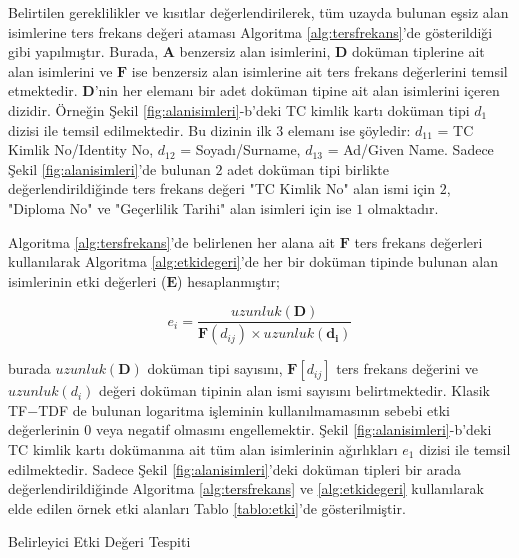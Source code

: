 \documentclass[conference, a4paper]{IEEEtran}
\begin{document}
Belirtilen gereklilikler ve kısıtlar değerlendirilerek, tüm uzayda bulunan eşsiz alan isimlerine ters frekans değeri
ataması Algoritma \ref{alg:tersfrekans}'de gösterildiği gibi yapılmıştır. Burada, $\mathbf{A}$ benzersiz alan
isimlerini, $\mathbf{D}$ doküman tiplerine ait alan isimlerini ve  $\mathbf{F}$ ise benzersiz alan isimlerine ait ters
frekans değerlerini temsil etmektedir. $\mathbf{D}$'nin her elemanı bir adet doküman tipine ait alan isimlerini içeren
dizidir. Örneğin Şekil \ref{fig:alanisimleri}-b'deki TC kimlik kartı doküman tipi $d_1$ dizisi ile temsil edilmektedir.
Bu dizinin ilk $3$ elemanı ise şöyledir: $d_{11}$ = TC Kimlik No/Identity No, $d_{12}$ = Soyadı/Surname, $d_{13}$ =
Ad/Given Name. Sadece Şekil \ref{fig:alanisimleri}'de bulunan $2$ adet doküman tipi birlikte değerlendirildiğinde ters
frekans değeri "TC Kimlik No" alan ismi için $2$, "Diploma No" ve "Geçerlilik Tarihi" alan isimleri için ise $1$
olmaktadır.

Algoritma \ref{alg:tersfrekans}'de belirlenen her alana ait $\mathbf{F}$ ters frekans değerleri kullanılarak Algoritma
\ref{alg:etkidegeri}'de her bir doküman tipinde bulunan alan isimlerinin etki değerleri ($\mathbf{E}$) hesaplanmıştır;

\begin{equation}
    e_i = \frac{uzunluk(\mathbf{D})}{\mathbf{F}(d_{ij}) \times uzunluk(\mathbf{d_i})}
\end{equation}{}

\noindent burada $uzunluk(\mathbf{D})$ doküman tipi sayısını, $\mathbf{F}[d_{ij}]$ ters frekans değerini ve
$uzunluk(d_i)$ değeri doküman tipinin alan ismi sayısını belirtmektedir. Klasik TF$-$TDF de bulunan logaritma
işleminin kullanılmamasının sebebi etki değerlerinin $0$ veya negatif olmasını engellemektir.
Şekil \ref{fig:alanisimleri}-b'deki TC kimlik kartı dokümanına ait tüm alan isimlerinin ağırlıkları $e_1$ dizisi ile
temsil edilmektedir. Sadece Şekil \ref{fig:alanisimleri}'deki doküman tipleri bir arada değerlendirildiğinde Algoritma
\ref{alg:tersfrekans} ve \ref{alg:etkidegeri} kullanılarak elde edilen örnek etki alanları Tablo \ref{tablo:etki}'de
gösterilmiştir.

\begin{algorithm}
    \SetAlgoLined
    \caption{Belirleyici Etki Değeri Tespiti}
    \label{alg:etkidegeri}
\end{algorithm}
\end{document}
